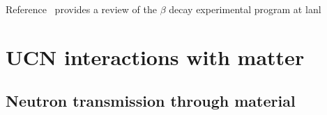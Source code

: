 Reference~\cite{Young2014} provides a review of the $\beta$ decay experimental program at \acrshort{lanl}



\section{UCN interactions with matter}\label{sec:ucn_matter_int}



\subsection{Neutron transmission through material}



